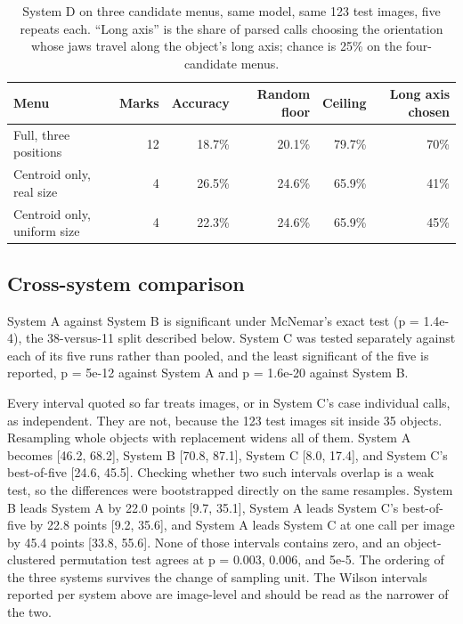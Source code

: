 \documentclass[12pt,letterpaper]{article}
\begin{document}
\begin{table}[H]
\centering
\caption{System D on three candidate menus, same model, same 123 test
images, five repeats each. ``Long axis'' is the share of parsed calls
choosing the orientation whose jaws travel along the object's long
axis; chance is 25\% on the four-candidate menus.}
\label{tab:menus}
\begin{tabular}{lrrrrr}
\toprule
Menu & Marks & Accuracy & Random floor & Ceiling & Long axis chosen \\
\midrule
Full, three positions          & 12 & 18.7\% & 20.1\% & 79.7\% & 70\% \\
Centroid only, real size       &  4 & 26.5\% & 24.6\% & 65.9\% & 41\% \\
Centroid only, uniform size    &  4 & 22.3\% & 24.6\% & 65.9\% & 45\% \\
\bottomrule
\end{tabular}
\end{table}

\subsection{Cross-system comparison}

System A against System B is significant under McNemar's exact test (p =
1.4e-4), the 38-versus-11 split described below. System C was tested
separately against each of its five runs rather than pooled, and the
least significant of the five is reported, p = 5e-12 against System A
and p = 1.6e-20 against System B.

Every interval quoted so far treats images, or in System C's case
individual calls, as independent. They are not, because the 123 test
images sit inside 35 objects. Resampling whole objects with replacement
widens all of them. System A becomes [46.2, 68.2], System B [70.8,
87.1], System C [8.0, 17.4], and System C's best-of-five [24.6, 45.5].
Checking whether two such intervals overlap is a weak test, so the
differences were bootstrapped directly on the same resamples. System B
leads System A by 22.0 points [9.7, 35.1], System A leads System C's
best-of-five by 22.8 points [9.2, 35.6], and System A leads System C at
one call per image by 45.4 points [33.8, 55.6]. None of those intervals
contains zero, and an object-clustered permutation test agrees at p =
0.003, 0.006, and 5e-5. The ordering of the three systems survives the
change of sampling unit. The Wilson intervals reported per system above
are image-level and should be read as the narrower of the two.
\end{document}
